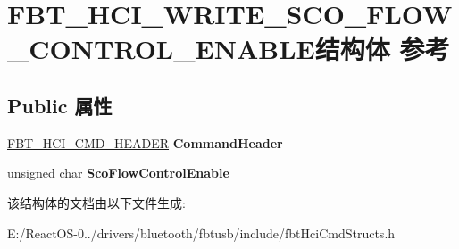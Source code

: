 \hypertarget{struct_f_b_t___h_c_i___w_r_i_t_e___s_c_o___f_l_o_w___c_o_n_t_r_o_l___e_n_a_b_l_e}{}\section{F\+B\+T\+\_\+\+H\+C\+I\+\_\+\+W\+R\+I\+T\+E\+\_\+\+S\+C\+O\+\_\+\+F\+L\+O\+W\+\_\+\+C\+O\+N\+T\+R\+O\+L\+\_\+\+E\+N\+A\+B\+L\+E结构体 参考}
\label{struct_f_b_t___h_c_i___w_r_i_t_e___s_c_o___f_l_o_w___c_o_n_t_r_o_l___e_n_a_b_l_e}
\subsection*{Public 属性}
\begin{DoxyCompactItemize}
\item 
\mbox{\label{struct_f_b_t___h_c_i___w_r_i_t_e___s_c_o___f_l_o_w___c_o_n_t_r_o_l___e_n_a_b_l_e_aba63447cdc23bc310199944742b82fbb}} 
\hyperlink{struct_f_b_t___h_c_i___c_m_d___h_e_a_d_e_r}{F\+B\+T\+\_\+\+H\+C\+I\+\_\+\+C\+M\+D\+\_\+\+H\+E\+A\+D\+ER} {\bfseries Command\+Header}
\item 
\mbox{\label{struct_f_b_t___h_c_i___w_r_i_t_e___s_c_o___f_l_o_w___c_o_n_t_r_o_l___e_n_a_b_l_e_a2d117eae7419edcd9994d28fea514239}} 
unsigned char {\bfseries Sco\+Flow\+Control\+Enable}
\end{DoxyCompactItemize}


该结构体的文档由以下文件生成\+:\begin{DoxyCompactItemize}
\item 
E\+:/\+React\+O\+S-\/0../drivers/bluetooth/fbtusb/include/fbt\+Hci\+Cmd\+Structs.\+h\end{DoxyCompactItemize}
